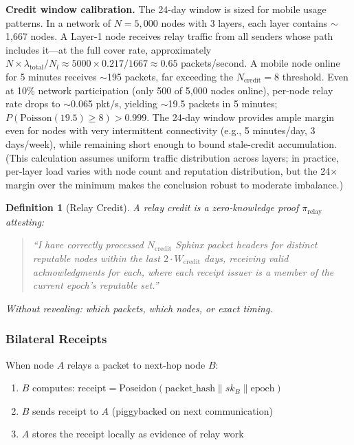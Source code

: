 \documentclass[11pt,a4paper]{article}
\newtheorem{definition}{Definition}
\begin{document}
\textbf{Credit window calibration.} The 24-day window is sized for mobile usage patterns. In a network of $N = 5{,}000$ nodes with 3 layers, each layer contains $\sim$1,667 nodes. A Layer-1 node receives relay traffic from all senders whose path includes it---at the full cover rate, approximately $N \times \lambda_{\text{total}} / N_l \approx 5000 \times 0.217 / 1667 \approx 0.65$ packets/second. A mobile node online for 5 minutes receives $\sim$195 packets, far exceeding the $N_{\text{credit}} = 8$ threshold. Even at 10\% network participation (only 500 of 5{,}000 nodes online), per-node relay rate drops to $\sim$0.065 pkt/s, yielding $\sim$19.5 packets in 5 minutes; $P(\text{Poisson}(19.5) \geq 8) > 0.999$. The 24-day window provides ample margin even for nodes with very intermittent connectivity (e.g., 5 minutes/day, 3 days/week), while remaining short enough to bound stale-credit accumulation. (This calculation assumes uniform traffic distribution across layers; in practice, per-layer load varies with node count and reputation distribution, but the 24$\times$ margin over the minimum makes the conclusion robust to moderate imbalance.)

\begin{definition}[Relay Credit]
A relay credit is a zero-knowledge proof $\pi_{\text{relay}}$ attesting:
\begin{quote}
``I have correctly processed $N_{\text{credit}}$ Sphinx packet headers for distinct reputable nodes within the last $2 \cdot W_{\text{credit}}$ days, receiving valid acknowledgments for each, where each receipt issuer is a member of the current epoch's reputable set.''
\end{quote}
Without revealing: which packets, which nodes, or exact timing.
\end{definition}

\subsubsection{Bilateral Receipts}

When node $A$ relays a packet to next-hop node $B$:
\begin{enumerate}[nosep]
    \item $B$ computes: $\text{receipt} = \text{Poseidon}(\text{packet\_hash} \| sk_B \| \text{epoch})$
    \item $B$ sends receipt to $A$ (piggybacked on next communication)
    \item $A$ stores the receipt locally as evidence of relay work
\end{enumerate}
\end{document}
